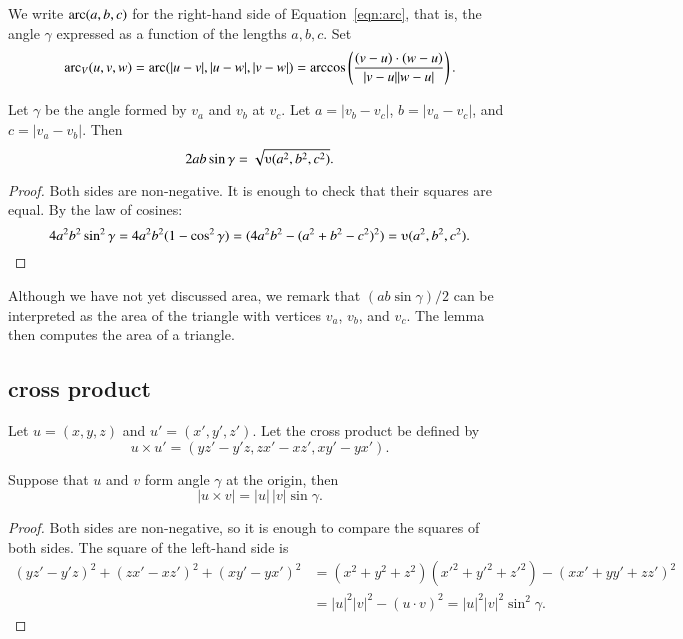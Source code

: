 \begin{definition}
We write $\operatorname{arc}(a,b,c)$ for the right-hand side of Equation~\ref{eqn:arc},
that is, the angle $\gamma$ expressed as a function
of the lengths $a,b,c$.  Set 
  $$\operatorname{arc}_V(u,v,w) = \operatorname{arc}(|u-v|,|u-w|,|v-w|) = 
    \arccos\left(\frac{(v-u)\cdot (w-u)}{|v-u| |w-u|}\right).$$
\end{definition}


\begin{lemma}
   Let $\gamma$ be the angle formed by $v_a$ and $v_b$ at $v_c$.  Let $a
    = |v_b - v_c|$, $b = |v_a - v_c|$, and $c = |v_a - v_b|$.  Then
        $$2 a b \sin\gamma = \sqrt{\ups(a^2,b^2,c^2)}.$$
\end{lemma}

\begin{proof}  Both sides are non-negative.  It is enough to check
that their squares are equal.  By the law of cosines:
      $$4 a^2 b^2 \sin^2\gamma = 4 a^2 b^2 (1-\cos^2\gamma) = (4 a^2 b^2 - (a^2 + b^2 -
      c^2)^2) = \ups(a^2,b^2,c^2).$$
\end{proof}

\begin{remark}  Although we have not yet discussed area, we remark
that $(a b \sin\gamma)/2$ can be interpreted as the area of the
triangle with vertices $v_a$, $v_b$, and $v_c$.  The lemma then
computes the area of a triangle.
\end{remark}





\subsection{cross product}%

\begin{definition}   Let $u =(x,y,z)$ and $u' = (x',y',z')$.  
Let the cross product be defined
by
    $$
    u \times u' = (y z' - y' z, z x' - x z', x y' - y x').
    $$
\end{definition}

\begin{lemma}  
Suppose that $u$ and $v$ form angle $\gamma$ at the origin, then
    $$|u \times v| = |u|\,|v|\sin\gamma.$$
\end{lemma}

\begin{proof}
   Both sides are non-negative, so it is enough to compare the
   squares of both sides.  The square of the left-hand side is
   $$
   \begin{array}{lll}
   (y z'- y'z)^2 + (z x' - x z')^2 + (x y' - y x')^2 &=
   (x^2 + y^2 + z^2)(x'^2 + y'^2 + z'^2) - (x x' + y y' + z z')^2
   \\&= |u|^2|v|^2 - (u\cdot v)^2 = |u|^2|v|^2 \sin^2\gamma.
   \end{array}
   $$
\end{proof}


